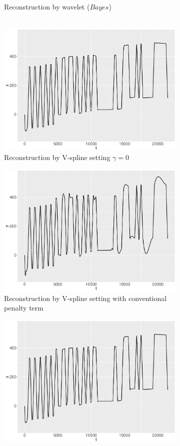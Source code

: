 \begin{figure}
\begin{subfigure}{0.45\textwidth}
    \caption{Reconstruction by wavelet ($\textit{Bayes}$)\\ \mbox{ } }\label{ggRealdataYBayes}
    \end{subfigure}
    \begin{subfigure}{0.45\textwidth}
    \centering
    \includegraphics[width=\linewidth,height=0.5\textwidth]{Chapters/02TractorSplineTheory/plot/ggplot/ggRealdataYTractorGamma.pdf}
    \caption{Reconstruction by V-spline setting  $\gamma=0$ }\label{ggRealdataYTractorGamma}
    \end{subfigure}
    \begin{subfigure}{0.45\textwidth}
    \centering
    \includegraphics[width=\linewidth,height=0.5\textwidth]{Chapters/02TractorSplineTheory/plot/ggplot/ggRealdataYTractorAPT.pdf}
    \caption{Reconstruction by V-spline setting with conventional penalty term}\label{ggRealdataYTractorAPT}
    \end{subfigure}
    \begin{subfigure}{0.45\textwidth}
    \centering
    \includegraphics[width=\linewidth,height=0.5\textwidth]{Chapters/02TractorSplineTheory/plot/ggplot/ggRealdataYTractor.pdf}

\end{subfigure}
\end{figure}
